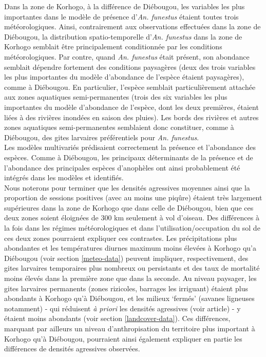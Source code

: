 \documentclass[12pt,twoside]{reedthesis}
\begin{document}
Dans la zone de Korhogo, à la différence de Diébougou, les variables les plus importantes dans le modèle de présence d'\emph{An. funestus} étaient toutes trois météorologiques. Ainsi, contrairement aux observations effectuées dans la zone de Diébougou, la distribution spatio-temporelle d'\emph{An. funestus} dans la zone de Korhogo semblait être principalement conditionnée par les conditions météorologiques. Par contre, quand \emph{An. funestus} était présent, son abondance semblait dépendre fortement des conditions paysagères (deux des trois variables les plus importantes du modèle d'abondance de l'espèce étaient paysagères), comme à Diébougou. En particulier, l'espèce semblait particulièrement attachée aux zones aquatiques semi-permanentes (trois des six variables les plus importantes du modèle d'abondance de l'espèce, dont les deux premières, étaient liées à des rivières inondées en saison des pluies). Les bords des rivières et autres zones aquatiques semi-permanentes semblaient donc constituer, comme à Diébougou, des gites larvaires préférentiels pour \emph{An. funestus}.\\

Les modèles multivariés prédisaient correctement la présence et l'abondance des espèces. Comme à Diébougou, les principaux déterminants de la présence et de l'abondance des principales espèces d'anophèles ont ainsi probablement été intégrés dans les modèles et identifiés.\\

Nous noterons pour terminer que les densités agressives moyennes ainsi que la proportion de sessions positives (avec au moins une piqûre) étaient très largement supérieures dans la zone de Korhogo que dans celle de Diébougou, bien que ces deux zones soient éloignées de 300 km seulement à vol d'oiseau. Des différences à la fois dans les régimes météorologiques et dans l'utilisation/occupation du sol de ces deux zones pourraient expliquer ces contrastes. Les précipitations plus abondantes et les températures diurnes maximum moins élevées à Korhogo qu'a Diébougou (voir section \ref{meteo-data}) peuvent impliquer, respectivement, des gites larvaires temporaires plus nombreux ou persistants et des taux de mortalité moins élevés dans la première zone que dans la seconde. Au niveau paysager, les gites larvaires permanents (zones rizicoles, barrages les irriguant) étaient plus abondants à Korhogo qu'à Diébougou, et les milieux `fermés' (savanes ligneuses notamment) - qui réduisent \emph{à priori} les densités agressives (voir article) - y étaient moins abondants (voir section \ref{landcover-data}). Ces différences, marquant par ailleurs un niveau d'anthropisation du territoire plus important à Korhogo qu'à Diébougou, pourraient ainsi également expliquer en partie les différences de densités agressives observées.\\
\end{document}
